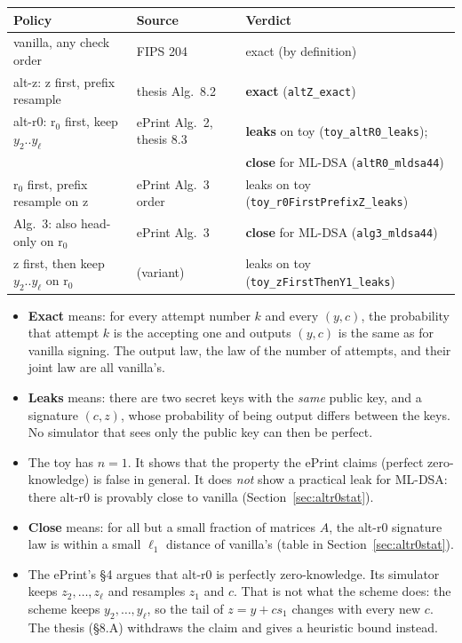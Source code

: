 \documentclass[11pt]{article}
\theoremstyle{definition}
\theoremstyle{remark}
\newcommand{\lean}[1]{\texttt{#1}}
\begin{document}
\begin{center}\small
\begin{tabular}{@{}lll@{}}
\toprule
Policy & Source & Verdict\\
\midrule
vanilla, any check order & FIPS 204 & exact (by definition)\\
alt-z: z first, prefix resample & thesis Alg.~8.2 & \textbf{exact} (\lean{altZ\_exact})\\
alt-r0: r$_0$ first, keep $y_2..y_\ell$ & ePrint Alg.~2, thesis 8.3 &
  \textbf{leaks} on toy (\lean{toy\_altR0\_leaks});\\
 & & \textbf{close} for ML-DSA (\lean{altR0\_mldsa44})\\
r$_0$ first, prefix resample on z & ePrint Alg.~3 order &
  leaks on toy (\lean{toy\_r0FirstPrefixZ\_leaks})\\
Alg.~3: also head-only on r$_0$ & ePrint Alg.~3 & \textbf{close} for ML-DSA (\lean{alg3\_mldsa44})\\
z first, then keep $y_2..y_\ell$ on r$_0$ & (variant) &
  leaks on toy (\lean{toy\_zFirstThenY1\_leaks})\\
\bottomrule
\end{tabular}
\end{center}

\begin{itemize}
\item \textbf{Exact} means: for every attempt number $k$ and every $(y,c)$, the probability that
  attempt $k$ is the accepting one and outputs $(y,c)$ is the same as for vanilla signing. The
  output law, the law of the number of attempts, and their joint law are all vanilla's.
\item \textbf{Leaks} means: there are two secret keys with the \emph{same} public key, and a
  signature $(c,z)$, whose probability of being output differs between the keys. No simulator
  that sees only the public key can then be perfect.
\item The toy has $n=1$. It shows that the property the ePrint claims (perfect zero-knowledge) is
  false in general. It does \emph{not} show a practical leak for ML-DSA: there alt-r0 is provably
  close to vanilla (Section~\ref{sec:altr0stat}).
\item \textbf{Close} means: for all but a small fraction of matrices $A$, the alt-r0 signature law
  is within a small $\ell_1$ distance of vanilla's (table in Section~\ref{sec:altr0stat}).
\item The ePrint's \S4 argues that alt-r0 is perfectly zero-knowledge. Its simulator keeps
  $z_2,\dots,z_\ell$ and resamples $z_1$ and $c$. That is not what the scheme does: the scheme
  keeps $y_2,\dots,y_\ell$, so the tail of $z = y + c s_1$ changes with every new $c$. The thesis
  (\S8.A) withdraws the claim and gives a heuristic bound instead.
\end{itemize}
\end{document}
